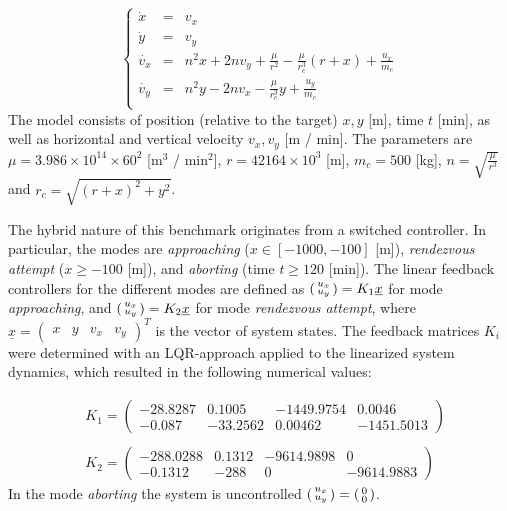 \documentclass[EPiC]{easychair}
\begin{document}
\[
\left\{
\begin{array}{lcl}
 \dot{x} & = & v_x \\
 \dot{y} & = & v_y \\
 \dot{v_x} & = & n^2 x + 2n v_y + \frac{\mu}{r^2} - \frac{\mu}{r_c^3} (r + x) + \frac{u_x}{m_c} \\
 \dot{v_y} & = & n^2 y - 2n v_x - \frac{\mu}{r_c^3} y + \frac{u_y}{m_c}\\
\end{array}
\right.
\]
The model consists of position (relative to the target) $x, y$ [m], time $t$ [min], as well as horizontal and vertical velocity $v_x, v_y$ [m / min]. The parameters are $\mu = 3.986 \times 10^{14} \times 60^2$ [m$^3$ / min$^2$], $r = 42164 \times 10^3$ [m], $m_c = 500$ [kg], $n = \sqrt{\frac{\mu}{r^3}}$ and $r_c = \sqrt{(r+x)^2 + y^2}$.

\newcommand{\vecT}[1]{\begin{pmatrix}#1\end{pmatrix}^T}
\newcommand{\psmat}[1]{\begin{psmallmatrix}#1\end{psmallmatrix}}

The hybrid nature of this benchmark originates from a switched controller. In particular, the modes are \textit{approaching}
($x \in [-1000, -100]$ [m]), \textit{rendezvous attempt} ($x \ge -100$ [m]), and \textit{aborting} (time $t \ge 120$ [min]). The linear feedback controllers for the different modes are defined as $\psmat{u_x \\ u_y} = K_1 \underline{x}$ for mode \textit{approaching}, and $\psmat{u_x \\ u_y} = K_2 \underline{x}$ for mode \textit{rendezvous attempt}, where $\underline{x} =
\vecT{x & y & v_x & v_y}$ is the vector of system states. The feedback matrices $K_i$ were determined with an LQR-approach applied to the linearized system dynamics, which resulted in the following numerical values:

\begin{align*}
	& K_1 = \begin{pmatrix} -28.8287 & 0.1005 & -1449.9754 &   0.0046 \\
  -0.087 & -33.2562 & 0.00462 & -1451.5013 \end{pmatrix} \\
    & ~ \\
    & K_2 = \begin{pmatrix} -288.0288 & 0.1312 & -9614.9898 & 0 \\
  -0.1312 & -288 & 0 & -9614.9883 \end{pmatrix}
\end{align*}
In the mode \textit{aborting} the system is uncontrolled $\psmat{u_x \\ u_y} = \psmat{0 \\ 0}$. 
\end{document}
